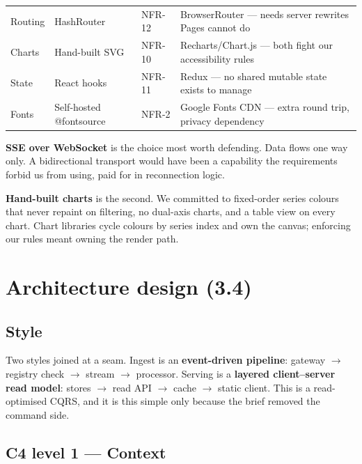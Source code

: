 \documentclass[11pt,a4paper]{article}
\begin{document}
\begin{center}
\begin{tabularx}{\textwidth}{@{}l l l X@{}}
Routing         & HashRouter    & NFR-12       & BrowserRouter --- needs server rewrites Pages cannot do \\
Charts          & Hand-built SVG & NFR-10      & Recharts/Chart.js --- both fight our accessibility rules \\
State           & React hooks   & NFR-11       & Redux --- no shared mutable state exists to manage \\
Fonts           & Self-hosted @fontsource & NFR-2 & Google Fonts CDN --- extra round trip, privacy dependency \\
\bottomrule
\end{tabularx}
\end{center}

\medskip
\noindent
\textbf{SSE over WebSocket} is the choice most worth defending. Data flows one way
only. A bidirectional transport would have been a capability the requirements forbid
us from using, paid for in reconnection logic.

\textbf{Hand-built charts} is the second. We committed to fixed-order series colours
that never repaint on filtering, no dual-axis charts, and a table view on every
chart. Chart libraries cycle colours by series index and own the canvas; enforcing
our rules meant owning the render path.

\section{Architecture design (3.4)}

\subsection*{Style}

Two styles joined at a seam. Ingest is an \textbf{event-driven pipeline}: gateway
$\rightarrow$ registry check $\rightarrow$ stream $\rightarrow$ processor. Serving is
a \textbf{layered client--server read model}: stores $\rightarrow$ read API
$\rightarrow$ cache $\rightarrow$ static client. This is a read-optimised CQRS, and
it is this simple only because the brief removed the command side.

\subsection*{C4 level 1 --- Context}
\end{document}
